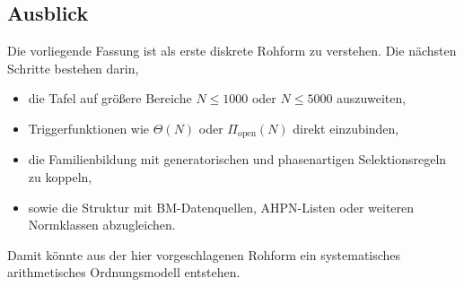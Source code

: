 \subsection{Ausblick}

Die vorliegende Fassung ist als erste diskrete Rohform zu verstehen. 
Die nächsten Schritte bestehen darin,
\begin{itemize}
	\item die Tafel auf größere Bereiche \(N\le 1000\) oder \(N\le 5000\) auszuweiten,
	\item Triggerfunktionen wie \(\Theta(N)\) oder \(\Pi_{\mathrm{open}}(N)\) direkt einzubinden,
	\item die Familienbildung mit generatorischen und phasenartigen Selektionsregeln zu koppeln,
	\item sowie die Struktur mit BM-Datenquellen, AHPN-Listen oder weiteren Normklassen abzugleichen.
\end{itemize}

Damit könnte aus der hier vorgeschlagenen Rohform ein systematisches arithmetisches Ordnungsmodell entstehen.